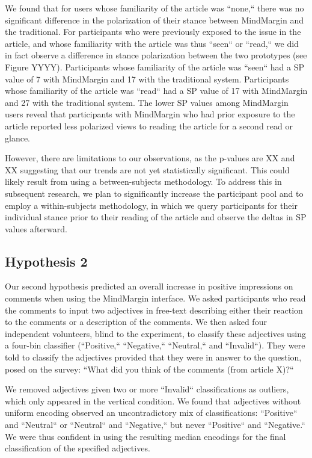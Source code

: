 We found that for users whose familiarity of the article was ``none,`` there was no significant difference in the polarization of their stance between MindMargin and the traditional. For participants who were previously exposed to the issue in the article, and whose familiarity with the article was thus ``seen`` or ``read,`` we did in fact observe a difference in stance polarization between the two prototypes (see Figure YYYY). Participants whose familiarity of the article was ``seen`` had a SP value of 7 with MindMargin and 17 with the traditional system. Participants whose familiarity of the article was ``read`` had a SP value of 17 with MindMargin and 27 with the traditional system. The lower SP values among MindMargin users reveal that participants with MindMargin who had prior exposure to the article reported less polarized views to reading the article for a second read or glance. 

However, there are limitations to our observations, as the p-values are XX and XX suggesting that our trends are not yet statistically significant. This could likely result from using a between-subjects methodology. To address this in subsequent research, we plan to significantly increase the participant pool and to employ a within-subjects methodology, in which we query participants for their individual stance prior to their reading of the article and observe the deltas in SP values afterward. 

\subsection{Hypothesis 2}
Our second hypothesis predicted an overall increase in positive impressions on comments when using the MindMargin interface. We asked participants who read the comments to input two adjectives in free-text describing either their reaction to the comments or a description of the comments. We then asked four independent volunteers, blind to the experiment, to classify these adjectives using a four-bin classifier (``Positive,`` ``Negative,`` ``Neutral,`` and ``Invalid``). They were told to classify the adjectives provided that they were in answer to the question, posed on the survey: ``What did you think of the comments (from article X)?`` 

We removed adjectives given two or more ``Invalid`` classifications as outliers, which only appeared in the vertical condition. We found that adjectives without uniform encoding observed an uncontradictory mix of classifications: ``Positive`` and ``Neutral`` or ``Neutral`` and ``Negative,`` but never ``Positive`` and ``Negative.`` We were thus confident in using the resulting median encodings for the final classification of the specified adjectives. 

